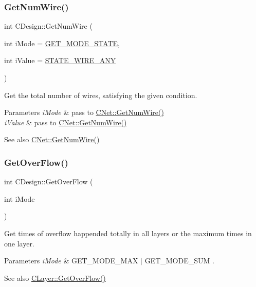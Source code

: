\subsubsection{\texorpdfstring{GetNumWire()}{GetNumWire()}}
{\footnotesize\ttfamily int C\+Design\+::\+Get\+Num\+Wire (\begin{DoxyParamCaption}\item[{int}]{i\+Mode = {\ttfamily \mbox{\hyperlink{BoxRouter_8h_a6f72f2cc9dd31793dd832ccfb2547de4}{G\+E\+T\+\_\+\+M\+O\+D\+E\+\_\+\+S\+T\+A\+TE}}},  }\item[{int}]{i\+Value = {\ttfamily \mbox{\hyperlink{BoxRouter_8h_a1b285251edd87e1423189470586cc719}{S\+T\+A\+T\+E\+\_\+\+W\+I\+R\+E\+\_\+\+A\+NY}}} }\end{DoxyParamCaption})}



Get the total number of wires, satisfying the given condition. 


\begin{DoxyParams}{Parameters}
{\em i\+Mode} & pass to \mbox{\hyperlink{classCNet_ae194cdbb585414b5eb533d0d097944b3}{C\+Net\+::\+Get\+Num\+Wire()}} \\
\hline
{\em i\+Value} & pass to \mbox{\hyperlink{classCNet_ae194cdbb585414b5eb533d0d097944b3}{C\+Net\+::\+Get\+Num\+Wire()}} \\
\hline
\end{DoxyParams}
\begin{DoxySeeAlso}{See also}
\mbox{\hyperlink{classCNet_ae194cdbb585414b5eb533d0d097944b3}{C\+Net\+::\+Get\+Num\+Wire()}} 
\end{DoxySeeAlso}
\mbox{\label{classCDesign_affc3b0b72b0991118a2141e11cbdab6e}} 
\subsubsection{\texorpdfstring{GetOverFlow()}{GetOverFlow()}}
{\footnotesize\ttfamily int C\+Design\+::\+Get\+Over\+Flow (\begin{DoxyParamCaption}\item[{int}]{i\+Mode }\end{DoxyParamCaption})}



Get times of overflow happended totally in all layers or the maximum times in one layer. 


\begin{DoxyParams}{Parameters}
{\em i\+Mode} & G\+E\+T\+\_\+\+M\+O\+D\+E\+\_\+\+M\+AX $\vert$ G\+E\+T\+\_\+\+M\+O\+D\+E\+\_\+\+S\+UM .\\
\hline
\end{DoxyParams}
\begin{DoxySeeAlso}{See also}
\mbox{\hyperlink{classCLayer_aef7ab8aa370e9133096e2a66788b7ead}{C\+Layer\+::\+Get\+Over\+Flow()}} 
\end{DoxySeeAlso}
\mbox{\label{classCDesign_af264117726c361d0404dcd97c6da2c35}} 
